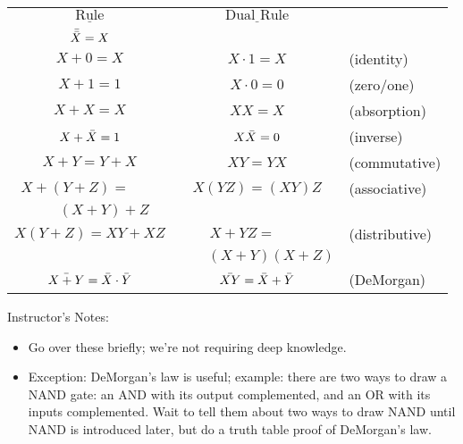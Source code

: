 \begin{frame}[fragile]
		\begin{center}
		\begin{tabular}{ccl}
		$\underline{\mbox{~~~Rule~~~}}$	& $\underline{\mbox{~~~Dual Rule~~~}}$ \\
		$\Bar{\Bar{X}} = X$ & \\
		$X+0=X$	& $X\cdot 1 = X$& (identity)\\
		$X+1=1$	& $X\cdot 0 = 0$& (zero/one)\\
		$X+X=X$	& $XX = X$ & (absorption)\\
		$X+\Bar{X}=1$ &$X\Bar{X} = 0$ & (inverse)\\
		$X+Y=Y+X$ & $XY = YX$&(commutative)\\
		$X+(Y+Z)=\qquad$ & $X(YZ) = (XY)Z$ & (associative)\\
		$\qquad (X+Y)+Z$ &\\
		$X(Y+Z) = XY+XZ$ & $X+YZ = \qquad$ & (distributive)\\
				& $\qquad (X+Y)(X+Z)$\\
		$\Bar{X+Y}=\Bar{X}\cdot\Bar{Y}$ & $\Bar{XY} = \Bar{X}+\Bar{Y}$
							& (DeMorgan)
		\end{tabular}
		\end{center}

\end{frame}
\BNotes\ifnum{}
\begin{frame}[fragile]
Instructor's Notes:
\begin{itemize}
\item Go over these briefly; we're not requiring deep knowledge.
\item Exception: DeMorgan's law is useful; example: there are two ways
	to draw a NAND gate: an AND with its output complemented, and an OR
	with its inputs complemented.  Wait to tell them about two ways to
	draw NAND until NAND is introduced later, but do a truth table proof
	of DeMorgan's law.
\end{itemize}
\end{frame}
\fi\ENotes

